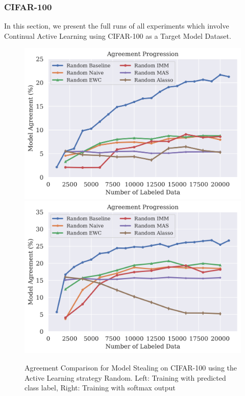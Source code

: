 \subsubsection{CIFAR-100}
\label{sec:Appendix:CALMS:CIFAR100}
In this section, we present the full runs of all experiments which involve Continual Active Learning using CIFAR-100 as a Target Model Dataset.

\begin{figure}[!htb]
    \centering
    \includegraphics[width=0.48\linewidth]{images/results_CALMS/cifar100_label_random.png} \hfill
    \includegraphics[width=0.48\linewidth]{images/results_CALMS/cifar100_softmax_random.png}
    \caption{Agreement Comparison for Model Stealing on CIFAR-100 using the Active Learning strategy Random. Left: Training with predicted class label,
    Right: Training with softmax output}
    \label{fig:CALMSCIFAR100Random}
\end{figure}


